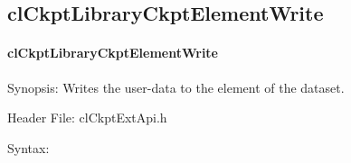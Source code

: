 \begin{flushleft}
\subsection{clCkptLibraryCkptElementWrite}
\hypertarget{pageckpt212}{}\paragraph{cl\-Ckpt\-Library\-Ckpt\-Element\-Write}\label{pageckpt212}
\begin{Desc}
\item[Synopsis:]Writes the user-data to the element of the dataset.\end{Desc}
\begin{Desc}
\item[Header File:]clCkptExtApi.h\end{Desc}
\begin{Desc}
\item[Syntax:]


\end{Desc}
\end{flushleft}
